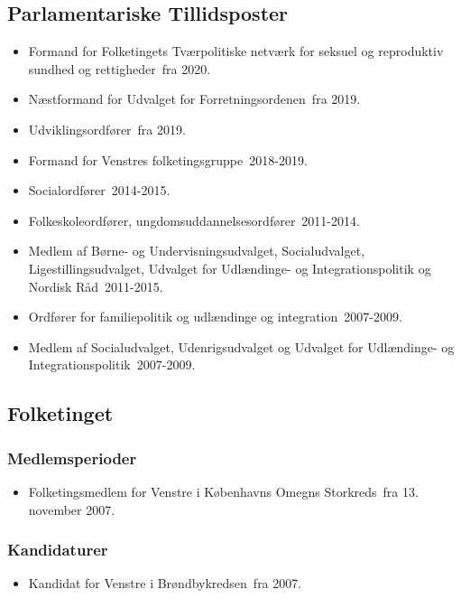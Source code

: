 \documentclass[11pt, a4paper]{awesome-cv}
\begin{document}
\begin{cvletter}
\subsection*{Parlamentariske Tillidsposter}
\begin{itemize}
\item Formand for Folketingets Tværpolitiske netværk for seksuel og reproduktiv sundhed og rettigheder fra 2020.
\item Næstformand for Udvalget for Forretningsordenen fra 2019.
\item Udviklingsordfører fra 2019.
\item Formand for Venstres folketingsgruppe 2018-2019.
\item Socialordfører 2014-2015.
\item Folkeskoleordfører, ungdomsuddannelsesordfører 2011-2014.
\item Medlem af Børne- og Undervisningsudvalget, Socialudvalget, Ligestillingsudvalget, Udvalget for Udlændinge- og Integrationspolitik og Nordisk Råd 2011-2015.
\item Ordfører for familiepolitik og udlændinge og integration 2007-2009.
\item Medlem af Socialudvalget, Udenrigsudvalget og Udvalget for Udlændinge- og Integrationspolitik 2007-2009.
\end{itemize}
\subsection*{Folketinget}
\subsubsection*{Medlemsperioder}
\begin{itemize}
\item Folketingsmedlem for Venstre i Københavns Omegns Storkreds fra 13. november 2007.
\end{itemize}
\subsubsection*{Kandidaturer}
\begin{itemize}
\item Kandidat for Venstre i Brøndbykredsen fra 2007.
\end{itemize}

\end{cvletter}
\end{document}
